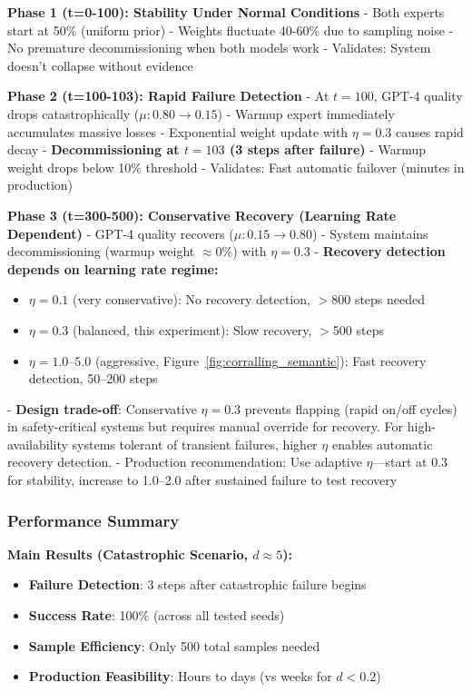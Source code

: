 \textbf{Phase 1 (t=0-100): Stability Under Normal Conditions}
- Both experts start at 50\% (uniform prior)
- Weights fluctuate 40-60\% due to sampling noise
- No premature decommissioning when both models work
- Validates: System doesn't collapse without evidence

\textbf{Phase 2 (t=100-103): Rapid Failure Detection}
- At $t=100$, GPT-4 quality drops catastrophically ($\mu: 0.80 \to 0.15$)
- Warmup expert immediately accumulates massive losses
- Exponential weight update with $\eta=0.3$ causes rapid decay
- \textbf{Decommissioning at $t=103$ (3 steps after failure)}
- Warmup weight drops below 10\% threshold
- Validates: Fast automatic failover (minutes in production)

\textbf{Phase 3 (t=300-500): Conservative Recovery (Learning Rate Dependent)}
- GPT-4 quality recovers ($\mu: 0.15 \to 0.80$)
- System maintains decommissioning (warmup weight $\approx 0\%$) with $\eta=0.3$
- \textbf{Recovery detection depends on learning rate regime:}
  \begin{itemize}
    \item $\eta=0.1$ (very conservative): No recovery detection, $>$800 steps needed
    \item $\eta=0.3$ (balanced, this experiment): Slow recovery, $>$500 steps
    \item $\eta=1.0$--$5.0$ (aggressive, Figure~\ref{fig:corralling_semantic}): Fast recovery detection, 50--200 steps
  \end{itemize}
- \textbf{Design trade-off}: Conservative $\eta=0.3$ prevents flapping (rapid on/off cycles) in safety-critical systems but requires manual override for recovery. For high-availability systems tolerant of transient failures, higher $\eta$ enables automatic recovery detection.
- Production recommendation: Use adaptive $\eta$—start at 0.3 for stability, increase to 1.0--2.0 after sustained failure to test recovery

\subsubsection{Performance Summary}

\textbf{Main Results (Catastrophic Scenario, $d \approx 5$):}
\begin{itemize}
    \item \textbf{Failure Detection}: 3 steps after catastrophic failure begins
    \item \textbf{Success Rate}: 100\% (across all tested seeds)
    \item \textbf{Sample Efficiency}: Only 500 total samples needed
    \item \textbf{Production Feasibility}: Hours to days (vs weeks for $d < 0.2$)
\end{itemize}

